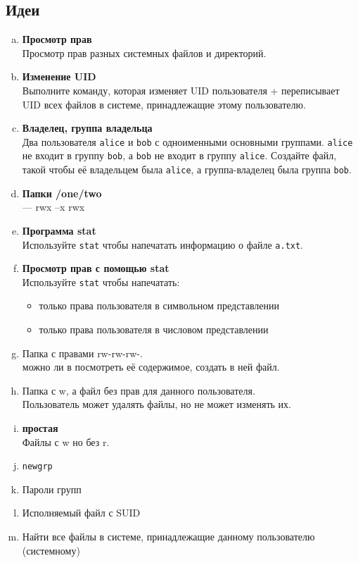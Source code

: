 \documentclass{article}
\begin{document}
\subsection*{Идеи}
\begin{enumerate}[a.]

\item \textbf{Просмотр прав}\\
Просмотр прав разных системных файлов и директорий.



\item \textbf{Изменение UID}\\
Выполните команду, которая изменяет UID пользователя + переписывает UID всех файлов в системе, принадлежащие этому пользователю. 

\item \textbf{Владелец, группа владельца}\\
Два пользователя \texttt{alice} и \texttt{bob} с одноименными основными группами. \texttt{alice} не входит в группу \texttt{bob}, а \texttt{bob} не входит в группу \texttt{alice}. Создайте файл, такой чтобы её владельцем была \texttt{alice}, а группа-владелец была группа \texttt{bob}.

\item \textbf{Папки /one/two}\\
--- rwx
--x rwx

\item \textbf{Программа stat}\\
Используйте \texttt{stat} чтобы напечатать информацию о файле \texttt{a.txt}.

\item \textbf{Просмотр прав с помощью stat}\\
Используйте \texttt{stat} чтобы напечатать: 
\begin{itemize}
\item только права пользователя в символьном представлении
\item только права пользователя в числовом представлении
\end{itemize}

\item Папка с правами rw-rw-rw-.\\
можно ли в посмотреть её содержимое, создать в ней файл.


\item Папка с w, а файл без прав для данного пользователя.\\
Пользователь может удалять файлы, но не может изменять их.


\item \textbf{простая}\\
Файлы с w но без r.


\item \texttt{newgrp}\\

\item Пароли групп\\

\item Исполняемый файл с SUID\\


\item Найти все файлы в системе, принадлежащие данному пользователю (системному)\\

\end{enumerate}
\fi
\end{document}
